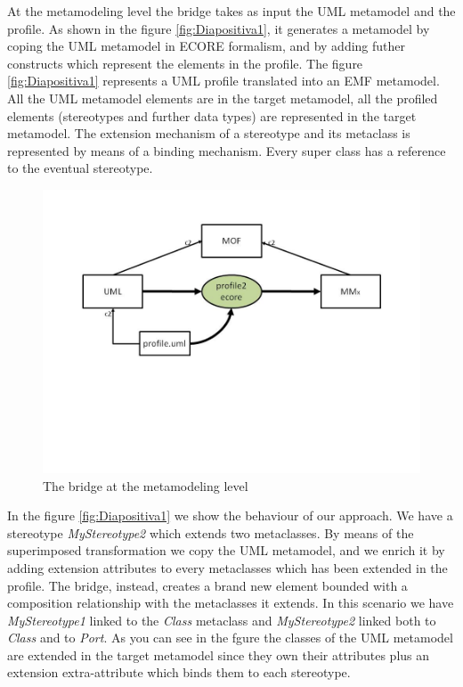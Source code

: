 At the metamodeling level the bridge takes as input the UML metamodel and the profile. As shown in the figure \ref{fig:Diapositiva1}, it generates a metamodel by coping the UML metamodel in ECORE formalism, and by adding futher constructs which represent the elements in the profile.  The figure \ref{fig:Diapositiva1} represents a UML profile translated into an EMF metamodel. All the UML metamodel elements are in the target metamodel, all the profiled elements (stereotypes and further data types) are represented in the target metamodel. The extension mechanism of a stereotype and its metaclass is represented by means of a binding mechanism. Every super class has a reference to the eventual stereotype.
\begin{figure}[htbp]
	\centering
		\includegraphics[width=1.00\textwidth]{figures/Diapositiva2.JPG}
	\caption{The bridge at the metamodeling level}
	\label{fig:Diapositiva2}
\end{figure}
In the figure \ref{fig:Diapositiva1} we show the behaviour of our approach. We have a stereotype \emph{MyStereotype2} which extends two metaclasses. By means of the superimposed  transformation we copy the UML metamodel, and we enrich it by adding extension attributes to every metaclasses which has been extended in the profile. The bridge, instead, creates a brand new element bounded with a composition relationship with the metaclasses it extends. In this scenario we have \emph{MyStereotype1} linked to the \emph{Class} metaclass and \emph{MyStereotype2} linked both to \emph{Class} and to \emph{Port}. As you can see in the fgure the classes of the UML metamodel are extended in the target metamodel since they own their attributes plus an extension extra-attribute which binds them to each stereotype.

